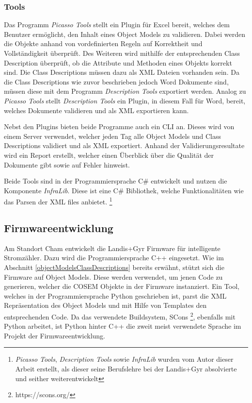 \subsubsection{Tools}
Das Programm \textit{Picasso Tools} stellt ein Plugin für Excel bereit, welches dem Benutzer ermöglicht, den Inhalt eines Object Models zu validieren.
Dabei werden die Objekte anhand von vordefinierten Regeln auf Korrektheit und Vollständigkeit überprüft.
Des Weiteren wird mithilfe der entsprechenden Class Description überprüft, ob die Attribute und Methoden eines Objekts korrekt sind.
Die Class Descriptions müssen dazu als XML Dateien vorhanden sein.
Da die Class Descriptions wie zuvor beschrieben jedoch Word Dokumente sind, müssen diese mit dem Programm \textit{Description Tools} exportiert werden.
Analog zu \textit{Picasso Tools} stellt \textit{Description Tools} ein Plugin, in diesem Fall für Word, bereit, welches Dokumente validieren und als XML exportieren kann.

Nebst den Plugins bieten beide Programme auch ein \ac{CLI} an.
Dieses wird von einem Server verwendet, welcher jeden Tag alle Object Models und Class Descriptions validiert und als XML exportiert.
Anhand der Validierungsresultate wird ein Report erstellt, welcher einen Überblick über die Qualität der Dokumente gibt sowie auf Fehler hinweist.

Beide Tools sind in der Programmiersprache C\# entwickelt und nutzen die Komponente \textit{InfraLib}.
Diese ist eine C\# Bibliothek, welche Funktionalitäten wie das Parsen der XML files anbietet. 
\footnote{\textit{Picasso Tools}, \textit{Description Tools} sowie \textit{InfraLib} wurden vom Autor dieser Arbeit erstellt, als dieser seine Berufslehre bei der Landis+Gyr absolvierte und seither weiterentwickelt }

\subsection{Firmwareentwicklung}\label{fwEntwicklung}
Am Standort Cham entwickelt die Landis+Gyr Firmware für intelligente Stromzähler.
Dazu wird die Programmiersprache C++ eingesetzt.
Wie im Abschnitt \ref{objectModelsClassDescriptions} bereits erwähnt, stützt sich die Firmware auf Object Models.
Diese werden verwendet, um jenen Code zu generieren, welcher die \ac{COSEM} Objekte in der Firmware instanziert.
Ein Tool, welches in der Programmiersprache Python geschrieben ist, parst die XML Repräsentation des Object Models und mit Hilfe von Templates den entsprechenden Code.
Da das verwendete Buildsystem, SCons \footnote{https://scons.org/}, ebenfalls mit Python arbeitet, ist Python hinter C++ die zweit meist verwendete Sprache im Projekt der Firmwareentwicklung.

